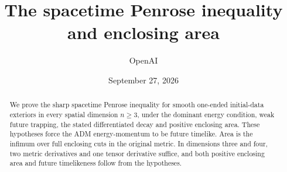 \documentclass[11pt]{article}
\title{The spacetime Penrose inequality and enclosing area}
\author{OpenAI}
\date{September 27, 2026}
\begin{document}
\maketitle
\begin{abstract}
We prove the sharp spacetime Penrose inequality for smooth one-ended
initial-data exteriors in every spatial dimension $n\ge3$, under the
dominant energy condition, weak future trapping, the stated differentiated
decay and positive enclosing area. These hypotheses force the ADM
energy-momentum to be future timelike. Area is the infimum over full
enclosing cuts in the original metric. In dimensions three and four,
two metric derivatives and one tensor derivative suffice, and both
positive enclosing area and future timelikeness follow from the hypotheses.
\end{abstract}
\tableofcontents










\end{document}

